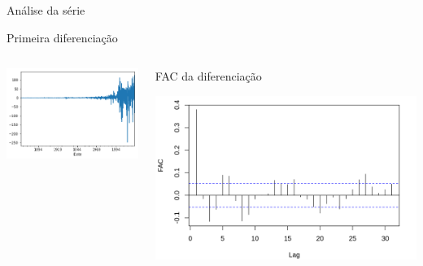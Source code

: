 \documentclass[compress,aspectratio=149,brazil]{beamer}
\begin{document}
\begin{frame}{Análise da série}
    \begin{block}{Primeira diferenciação}
        \begin{columns}
            \begin{column}{.5\textwidth}
                \begin{center}
                    \includegraphics[width=.9\textwidth]{../images/sp500diff.png}
                \end{center}
            \end{column}
            \begin{column}{.5\textwidth}
                \begin{block}{FAC da diferenciação}
                    \begin{center}
                        \includegraphics[width=.9\textwidth]{../images/SP500_diff_FAC.png}
                    \end{center}
                \end{block}
            \end{column}
        \end{columns}
    \end{block}
\end{frame}
\end{document}
